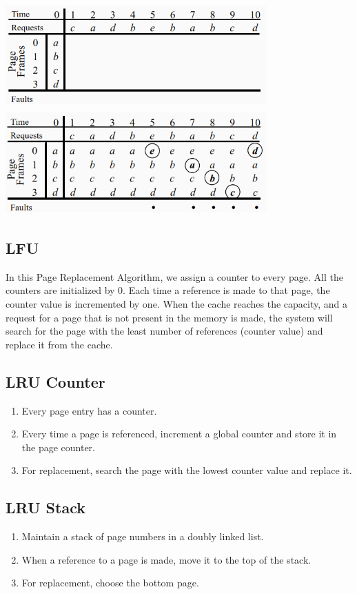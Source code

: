 \documentclass[12pt]{article}
\begin{document}
		\includegraphics[width=10cm,height=4cm]{FIFO_1}\\
		\centering\includegraphics[width=10cm,height=4cm]{FIFO_2}	
		\pagebreak
		\begin{flushleft}
			\subsection{LFU}
		In this Page Replacement Algorithm, we assign a counter to every page. All the counters are initialized by 0. Each time a reference is made to that page, the counter value is incremented by one. When the cache reaches the capacity, and a request for a page that is not present in the memory is made, the system will search for the page with the least number of references (counter value) and replace it from the cache.
		\subsection{LRU Counter}
		\begin{enumerate}
			\item Every page entry has a counter.
			\item Every time a page is referenced, increment a global counter and store it in the page counter.
			\item For replacement, search the page with the lowest counter value and replace it.
		\end{enumerate}
		\subsection{LRU Stack}
		\begin{enumerate}
			\item Maintain a stack of page numbers in a doubly linked list.
			\item When a reference to a page is made, move it to the top of the stack.
			\item For replacement, choose the bottom page.
		\end{enumerate}
		
		\end{flushleft}\pagebreak
\end{document}
